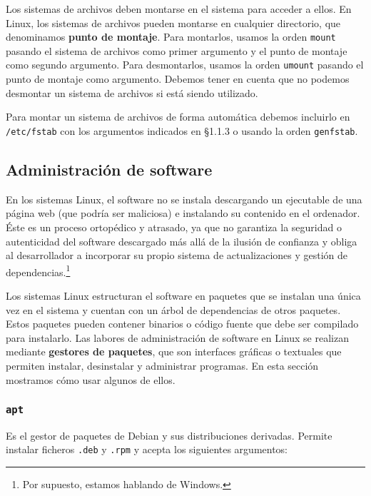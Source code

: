 Los sistemas de archivos deben montarse en el sistema para acceder a ellos.
En Linux, los sistemas de archivos pueden montarse en cualquier directorio, que denominamos \textbf{punto de montaje}.
Para montarlos, usamos la orden \texttt{mount} pasando el sistema de archivos como primer argumento y el punto de montaje como segundo argumento.
Para desmontarlos, usamos la orden \texttt{umount} pasando el punto de montaje como argumento.
Debemos tener en cuenta que no podemos desmontar un sistema de archivos si está siendo utilizado.

Para montar un sistema de archivos de forma automática debemos incluirlo en \texttt{/etc/fstab} con los argumentos indicados en \S1.1.3 o usando la orden \texttt{genfstab}.

\subsection{Administración de software}

En los sistemas Linux, el software no se instala descargando un ejecutable de una página web (que podría ser maliciosa) e instalando su contenido en el ordenador.
Éste es un proceso ortopédico y atrasado, ya que no garantiza la seguridad o autenticidad del software descargado más allá de la ilusión de confianza y obliga al desarrollador a incorporar su propio sistema de actualizaciones y gestión de dependencias.\footnote{Por supuesto, estamos hablando de Windows.}

Los sistemas Linux estructuran el software en paquetes que se instalan una única vez en el sistema y cuentan con un árbol de dependencias de otros paquetes.
Estos paquetes pueden contener binarios o código fuente que debe ser compilado para instalarlo.
Las labores de administración de software en Linux se realizan mediante \textbf{gestores de paquetes}, que son interfaces gráficas o textuales que permiten instalar, desinstalar y administrar programas.
En esta sección mostramos cómo usar algunos de ellos.

\subsubsection{\texttt{apt}}

Es el gestor de paquetes de Debian y sus distribuciones derivadas.
Permite instalar ficheros \texttt{.deb} y \texttt{.rpm} y acepta los siguientes argumentos:

